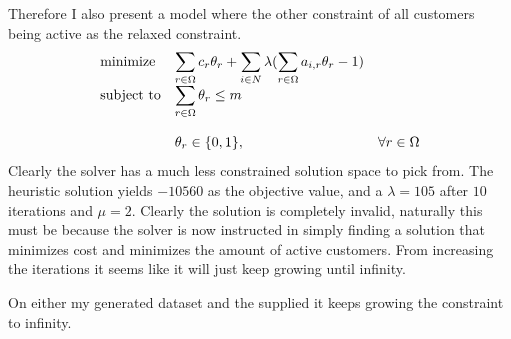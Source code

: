 \documentclass{article}
\begin{document}
    Therefore I also present a model where the other constraint of all customers being active as the relaxed constraint.
    \begin{equation*}
        \begin{array}{ll@{}ll}
            \text{minimize}  & \displaystyle\sum_{r \in \Omega} c_r \theta_r + \sum_{i \in N} \lambda(\sum_{r \in \Omega} a_{i, r} \theta_r - 1)& &\\
            \text{subject to}&  \displaystyle\sum_{r \in \Omega} \theta_r \leq m &   &\\\\
            & \displaystyle \theta_r  \in \{0,1\},  && \forall r \in \Omega
        \end{array}
    \end{equation*}
    Clearly the solver has a much less constrained solution space to pick from.
    The heuristic solution yields $-10560$ as the objective value, and a $\lambda=105$ after $10$ iterations and $\mu = 2$.
    Clearly the solution is completely invalid, naturally this must be because the solver is now instructed in simply finding a solution that minimizes cost and minimizes the amount of active customers.
    From increasing the iterations it seems like it will just keep growing until infinity.

    On either my generated dataset and the supplied it keeps growing the constraint to infinity.
\end{document}
